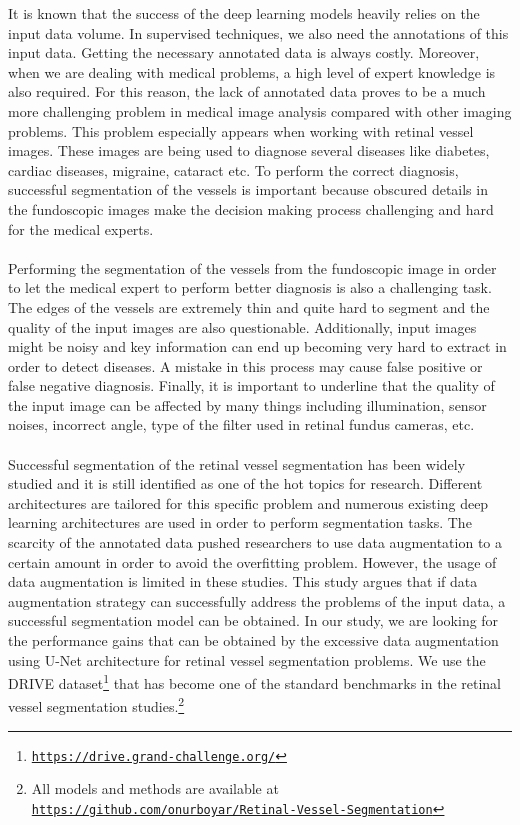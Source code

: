 \documentclass{article}
\begin{document}
It is known that the success of the deep learning models heavily relies on the input data volume. In supervised techniques, we also need the annotations of this input data. Getting the necessary annotated data is always costly. Moreover, when we are dealing with  medical problems, a high level of expert knowledge is also required. For this reason, the lack of annotated data proves to be a much more challenging problem  in medical image analysis compared with other imaging problems. This problem especially appears when working with retinal vessel images. These images are being used to diagnose several diseases like diabetes, cardiac diseases, migraine, cataract etc. To perform the correct diagnosis, successful segmentation of the vessels is important because obscured details in the fundoscopic images make the decision making process challenging and hard for the medical experts.  \\\\

Performing the segmentation of the vessels from the fundoscopic image in order to let the medical expert to perform better diagnosis is also a challenging task. The edges of the vessels are extremely thin and quite hard to segment and the quality of the input images are also questionable. Additionally, input images might be noisy and key information can end up  becoming very hard to extract in order to detect diseases. A mistake in this process may cause false positive or false negative diagnosis. Finally, it is important to underline that the quality of the input image can be affected by many things including illumination, sensor noises, incorrect angle, type of the filter used in retinal fundus cameras, etc. \\\\

Successful segmentation of the retinal vessel segmentation has been widely studied and it is still identified as one of the hot topics for research. Different architectures are tailored for this specific problem and numerous existing deep learning architectures are used in order to perform segmentation tasks. The scarcity of the annotated data pushed researchers to use data augmentation to a certain amount in order to avoid the overfitting problem. However, the usage of data augmentation is limited in these studies. This study argues that if data augmentation strategy can successfully address the problems of the input data, a successful segmentation model can be obtained. In our study, we are looking for the performance gains that can be obtained by the excessive data augmentation using U-Net architecture for retinal vessel segmentation problems. We use the DRIVE dataset\footnote{\label{drive}\href{https://drive.grand-challenge.org/}{\texttt{https://drive.grand-challenge.org/}}} that has become one of the standard benchmarks in the retinal vessel segmentation studies.\footnote{All models and methods are available at \href{https://github.com/onurboyar/Retinal-Vessel-Segmentation}{ \texttt{https://github.com/onurboyar/Retinal-Vessel-Segmentation}}}
\end{document}
